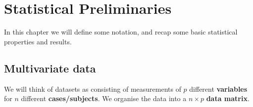 \documentclass[]{book}
\theoremstyle{definition}
\theoremstyle{definition}
\theoremstyle{definition}
\theoremstyle{remark}
\begin{document}
\renewcommand{\bY}{\boldsymbol Y}
\renewcommand{\bx}{\boldsymbol x}
\renewcommand{\bX}{\boldsymbol X}
\renewcommand{\bH}{\boldsymbol H}
\renewcommand{\by}{\boldsymbol y}
\renewcommand{\bz}{\boldsymbol z}
\renewcommand{\bS}{\boldsymbol S}
\renewcommand{\bR}{\boldsymbol R}
\renewcommand{\bmu}{\boldsymbol \mu}
\renewcommand{\bSigma}{\boldsymbol \Sigma}
\renewcommand{\bLambda}{\boldsymbol \Lambda}
\renewcommand{\bgamma}{\boldsymbol \gamma}
\renewcommand{\blambda}{\boldsymbol \lambda}
\renewcommand{\bA}{\boldsymbol A}
\renewcommand{\bB}{\boldsymbol B}
\renewcommand{\bD}{\boldsymbol D}
\renewcommand{\bM}{\boldsymbol M}
\renewcommand{\bP}{\boldsymbol P}
\renewcommand{\bQ}{\boldsymbol Q}
\renewcommand{\bT}{\boldsymbol T}
\renewcommand{\bW}{\boldsymbol W}
\renewcommand{\ba}{\boldsymbol a}
\renewcommand{\bb}{\boldsymbol b}
\renewcommand{\bc}{\boldsymbol c}
\renewcommand{\bd}{\boldsymbol d}
\renewcommand{\bh}{\boldsymbol h}
\renewcommand{\bp}{\boldsymbol p}
\renewcommand{\bq}{\boldsymbol q}
\renewcommand{\bu}{\boldsymbol u}
\renewcommand{\bzero}{\boldsymbol 0}
\renewcommand{\mR}{\mathbb R}
\renewcommand{\cR}{\mathcal R}

\renewcommand{\bs}{\boldsymbol}
\renewcommand{\ds}{\displaystyle}
\renewcommand{\tdiag}{\text{diag}}
\renewcommand{\ttr}{\text{tr}}
\renewcommand{\tmin}{\text{min}}
\renewcommand{\tmax}{\text{max}}
\renewcommand{\tdet}{\text{det}}

\renewcommand{\tcov}{\text{cov}}
\renewcommand{\texp}{\text{exp}}
\renewcommand{\lb}{\left(}
\renewcommand{\rb}{\right)}
\renewcommand{\lsb}{\left[}
\renewcommand{\rsb}{\right]}

\hypertarget{stat-prelim}{%
\chapter{Statistical Preliminaries}\label{stat-prelim}}

In this chapter we will define some notation, and recap some basic statistical properties and results.

\hypertarget{multivariate-data}{%
\section{Multivariate data}\label{multivariate-data}}

We will think of datasets as consisting of measurements of \(p\) different \textbf{variables} for \(n\) different \textbf{cases/subjects}. We organise the data into a \(n \times p\) \textbf{data matrix}.
\end{document}
